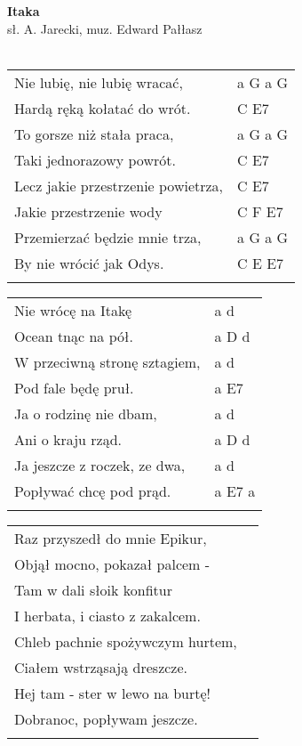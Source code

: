 \documentclass[a5paper]{article}
\begin{document}


\noindent
\fontsize{12pt}{15pt}\selectfont
\textbf{Itaka} \\
\fontsize{8pt}{10pt}\selectfont
sł. A. Jarecki, muz. Edward Pałłasz \\ \\
\fontsize{10pt}{12pt}\selectfont
{}
\begin{tabular}{@{}p{8.50cm}p{3cm}@{}}
\noindent
Nie lubię, nie lubię wracać, & a G a G \\
Hardą ręką kołatać do wrót. & C E7 \\
To gorsze niż stała praca, & a G a G \\
Taki jednorazowy powrót. & C E7 \\
Lecz jakie przestrzenie powietrza, & C E7 \\
Jakie przestrzenie wody & C F E7 \\
Przemierzać będzie mnie trza, & a G a G \\
By nie wrócić jak Odys. & C E E7 \\ \\
\end{tabular}

\noindent
\begin{tabular}{@{}p{7.50cm}p{3cm}@{}}
Nie wrócę na Itakę & a d \\
Ocean tnąc na pół. & a D d \\
W przeciwną stronę sztagiem, & a d \\
Pod fale będę pruł. & a E7 \\
Ja o rodzinę nie dbam, & a d \\
Ani o kraju rząd. & a D d \\
Ja jeszcze z roczek, ze dwa, & a d \\
Popływać chcę pod prąd. & a E7 a \\ \\
\end{tabular}

\noindent
\begin{tabular}{@{}p{7.50cm}p{3cm}@{}}
Raz przyszedł do mnie Epikur, \\
Objął mocno, pokazał palcem - \\
Tam w dali słoik konfitur \\
I herbata, i ciasto z zakalcem. \\
Chleb pachnie spożywczym hurtem, \\
Ciałem wstrząsają dreszcze. \\
Hej tam - ster w lewo na burtę! \\
Dobranoc, popływam jeszcze. \\ \\
\end{tabular}
\end{document}
